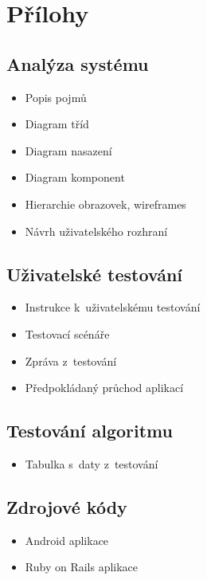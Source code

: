 \chapter*{Přílohy}
\renewcommand{\thesection}{\Alph{section}}

\section{Analýza systému}\label{app:analysis}
\begin{itemize}
	\item Popis pojmů
	\item Diagram tříd
	\item Diagram nasazení
	\item Diagram komponent
	\item Hierarchie obrazovek, wireframes
	\item Návrh uživatelského rozhraní
\end{itemize}

\section{Uživatelské testování}\label{app:user-testing}

\begin{itemize}
	\item Instrukce k~uživatelskému testování
	\item Testovací scénáře
	\item Zpráva z~testování
	\item Předpokládaný průchod aplikací
\end{itemize}

\section{Testování algoritmu}\label{app:algo-testing}

\begin{itemize}
	\item Tabulka s~daty z~testování
\end{itemize}

\section{Zdrojové kódy}

\begin{itemize}
	\item Android aplikace
	\item Ruby on Rails aplikace
\end{itemize}
